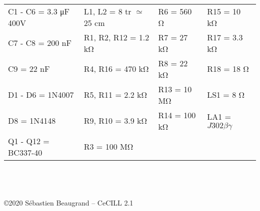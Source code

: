 \documentclass{kicad}
\begin{document}
\begin{center}
~\\
~\\
\hspace*{-4mm}\\
~\\
~\\
\begin{tabular}{llll}
C1 - C6  = 3.3 \si{\micro\farad} 400\si{\volt}&
L1, L2 = 8 tr $\simeq$ 25 \si{\centi\meter}&
R6 = 560 \si{\ohm}&
R15 = 10 \si{\kilo\ohm}\\
C7 - C8  = 200 \si{\nano\farad}&
R1, R2, R12 = 1.2 \si{\kilo\ohm}&
R7 = 27 \si{\kilo\ohm}&
R17 = 3.3 \si{\kilo\ohm}\\
C9 = 22 \si{\nano\farad}&
R4, R16 = 470 \si{\kilo\ohm}&
R8 = 22 \si{\kilo\ohm}&
R18 = 18 \si{\ohm}\\
D1 - D6  = 1N4007&
R5, R11 = 2.2 \si{\kilo\ohm}&
R13 = 10 \si{\mega\ohm}&
LS1 = 8 \si{\ohm}\\
D8 = 1N4148&
R9, R10 = 3.9 \si{\kilo\ohm}&
R14 = 100 \si{\kilo\ohm}&
LA1 = $J302\beta\gamma$\\
Q1 - Q12 = BC337-40&
R3 = 100 \si{\mega\ohm}
\end{tabular}
\\
~\\
\\
\vfill
\scriptsize
\copyright 2020 Sébastien Beaugrand -- CeCILL 2.1
\end{center}
\end{document}
